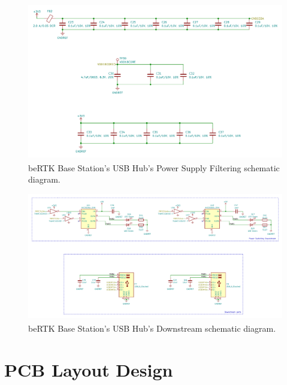 \begin{figure}[h]
	\centering
	\includegraphics[width=1.0\textwidth]{Chapters/Figures/chapter3/USB_Hub_PwrSplyFiltering.pdf}
	\caption{beRTK\textsuperscript{\textregistered} Base Station's USB Hub's Power Supply Filtering schematic diagram.}
	\label{fig:USB_Hub_PwrSplyFiltering_circuit}
\end{figure}

\begin{figure}[h]
	\centering
	\includegraphics[width=1.0\textwidth]{Chapters/Figures/chapter3/USB_Hub_Downstream.pdf}
	\caption{beRTK\textsuperscript{\textregistered} Base Station's USB Hub's Downstream schematic diagram.}
	\label{fig:USB_Hub_Downstream_circuit}
\end{figure}



\section{PCB Layout Design}\label{sec:33_PCBlayout}

